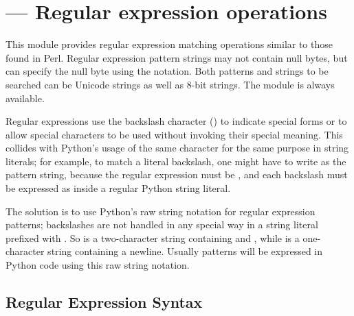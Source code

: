 \section{ ---
         Regular expression operations}




This module provides regular expression matching operations similar to
those found in Perl.  Regular expression pattern strings may not
contain null bytes, but can specify the null byte using the
 notation.  Both patterns and strings to be
searched can be Unicode strings as well as 8-bit strings.  The
 module is always available.

Regular expressions use the backslash character (\character{\e}) to
indicate special forms or to allow special characters to be used
without invoking their special meaning.  This collides with Python's
usage of the same character for the same purpose in string literals;
for example, to match a literal backslash, one might have to write
 as the pattern string, because the regular expression
must be \samp{\e\e}, and each backslash must be expressed as
\samp{\e\e} inside a regular Python string literal.

The solution is to use Python's raw string notation for regular
expression patterns; backslashes are not handled in any special way in
a string literal prefixed with .  So  is a
two-character string containing \character{\e} and ,
while  is a one-character string containing a newline.
Usually patterns will be expressed in Python code using this raw
string notation.

\begin{seealso}
\end{seealso}


\subsection{Regular Expression Syntax \label{re-syntax}}


